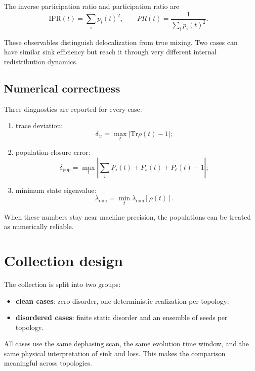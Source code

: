 \documentclass[11pt,a4paper]{article}
\newcommand{\abs}[1]{\left|#1\right|}
\begin{document}
The inverse participation ratio and participation ratio are
\begin{equation}
\mathrm{IPR}(t)=\sum_i p_i(t)^2,
\qquad
PR(t)=\frac{1}{\sum_i p_i(t)^2}.
\end{equation}

These observables distinguish delocalization from true mixing. Two cases can
have similar sink efficiency but reach it through very different internal
redistribution dynamics.

\subsection{Numerical correctness}

Three diagnostics are reported for every case:
\begin{enumerate}
  \item trace deviation:
  \begin{equation}
  \delta_{\mathrm{tr}}=\max_t\abs{\mathrm{Tr}\rho(t)-1};
  \end{equation}
  \item population-closure error:
  \begin{equation}
  \delta_{\mathrm{pop}}=\max_t\abs{\sum_i P_i(t)+P_s(t)+P_\ell(t)-1};
  \end{equation}
  \item minimum state eigenvalue:
  \begin{equation}
  \lambda_{\min}=\min_t \lambda_{\min}[\rho(t)].
  \end{equation}
\end{enumerate}

When these numbers stay near machine precision, the populations can be treated
as numerically reliable.

\section{Collection design}

The collection is split into two groups:
\begin{itemize}
  \item \textbf{clean cases}: zero disorder, one deterministic realization per topology;
  \item \textbf{disordered cases}: finite static disorder and an ensemble of seeds per topology.
\end{itemize}

All cases use the same dephasing scan, the same evolution time window, and the
same physical interpretation of sink and loss. This makes the comparison
meaningful across topologies.
\end{document}
